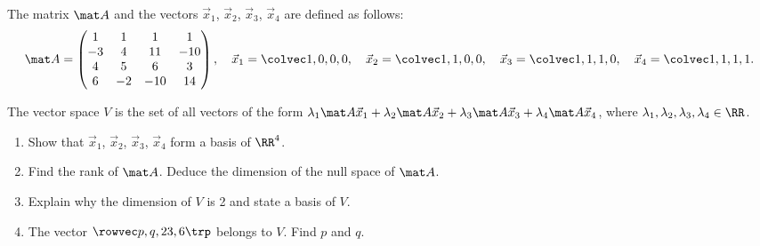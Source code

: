 \begin{problem}
    The matrix $\mat A$ and the vectors $\vec x_1$, $\vec x_2$, $\vec x_3$, $\vec x_4$ are defined as follows: \[\mat A = \begin{pmatrix}1 & 1 & 1 & 1 \\ -3 & 4 & 11 & -10 \\ 4 & 5 & 6 & 3 \\ 6 & -2 & -10 & 14\end{pmatrix}, \quad \vec x_1 = \cveciv1000, \quad \vec x_2 = \cveciv1100, \quad \vec x_3 = \cveciv1110, \quad \vec x_4 = \cveciv1111.\]

    The vector space $V$ is the set of all vectors of the form $\l_1 \mat A \vec x_1 + \l_2 \mat A \vec x_2 + \l_3 \mat A \vec x_3 + \l_4 \mat A \vec x_4$, where $\l_1, \l_2, \l_3, \l_4 \in \RR$.

    \begin{enumerate}
        \item Show that $\vec x_1$, $\vec x_2$, $\vec x_3$, $\vec x_4$ form a basis of $\RR^4$.
        \item Find the rank of $\mat A$. Deduce the dimension of the null space of $\mat A$.
        \item Explain why the dimension of $V$ is 2 and state a basis of $V$.
        \item The vector $\cvecivx{p}{q}{23}{6}$ belongs to $V$. Find $p$ and $q$.
    \end{enumerate}
\end{problem}
